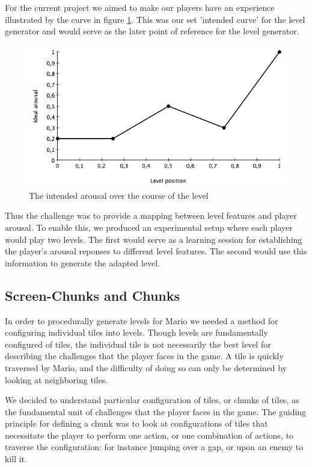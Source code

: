 \documentclass{llncs}
\begin{document}
For the current project we aimed to make our players have an experience illustrated by the curve in figure \ref{fig:ideal}.
This was our set 'intended curve' for the level generator and would serve as the later point of reference for the level generator.
\begin{figure}
\centering
\includegraphics[scale=0.4]{idealGraph.png}
\caption{The intended arousal over the course of the level}
\label{fig:ideal}
\end{figure}
Thus the challenge was to provide a mapping between level features and player arousal. To enable this, we produced an experimental setup where each player would play two levels.
The first would serve as a learning session for establishing the player's arousal reponses to different level features. The second would use this information to generate the adapted level.

\subsection{Screen-Chunks and Chunks}
In order to procedurally generate levels for Mario we needed a method for configuring individual tiles into levels.%
Though levels are fundamentally configured of tiles, the individual tile is not necessarily the best level for describing the challenges that the player faces in the game. A tile is quickly traversed by Mario, and the difficulty of doing so can only be determined by looking at neighboring tiles.

We decided to understand particular configuration of tiles, or chunks of tiles, as the fundamental unit of challenges that the player faces in the game.
The guiding principle for defining a chunk was to look at configurations of tiles that necessitate the player to perform one action, or one combination of actions, to traverse the configuration: for instance jumping over a gap, or upon an enemy to kill it.
\end{document}
